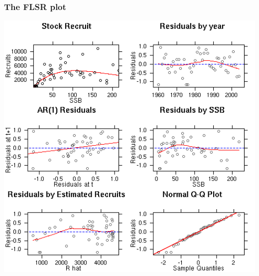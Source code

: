 \documentclass{beamer}%
\begin{document}
\begin{frame}[plain]
  \frametitle{The FLSR plot}
   \begin{center}
      \includegraphics[width=1\textwidth]{FLSR_plot.png}
   \end{center}
\end{frame}
\end{document}

